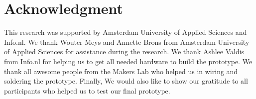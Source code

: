 \documentclass[sigconf]{acmart}
\begin{document}
\section{Acknowledgment}
This research was supported by Amsterdam University of Applied Sciences and Info.nl. 
We thank Wouter Meys and Annette Brons from Amsterdam University of Applied Sciences for assistance during the research.
We thank Ashlee Valdis from Info.nl for helping us to get all needed hardware to build the prototype. 
We thank all awesome people from the Makers Lab who helped us in wiring and soldering the prototype. 
Finally, We would also like to show our gratitude to all participants who helped us to test our final prototype. 





\end{document}
